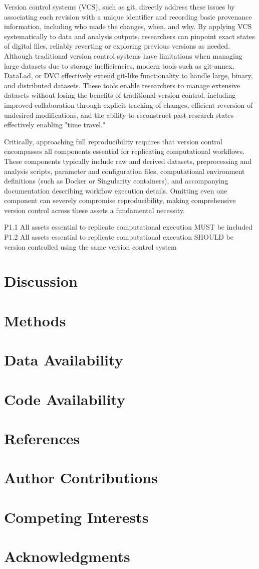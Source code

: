 \documentclass{article}
\begin{document}
Version control systems (VCS), such as git, directly address these issues by associating each revision with a unique identifier and recording basic provenance information, including who made the changes, when, and why.
By applying VCS systematically to data and analysis outputs, researchers can pinpoint exact states of digital files, reliably reverting or exploring previous versions as needed.
Although traditional version control systems have limitations when managing large datasets due to storage inefficiencies, modern tools such as git-annex, DataLad, or DVC effectively extend git-like functionality to handle large, binary, and distributed datasets.
These tools enable researchers to manage extensive datasets without losing the benefits of traditional version control, including improved collaboration through explicit tracking of changes, efficient reversion of undesired modifications, and the ability to reconstruct past research states—effectively enabling "time travel."

Critically, approaching full reproducibility requires that version control encompasses all components essential for replicating computational workflows.
These components typically include raw and derived datasets, preprocessing and analysis scripts, parameter and configuration files, computational environment definitions (such as Docker or Singularity containers), and accompanying documentation describing workflow execution details.
Omitting even one component can severely compromise reproducibility, making comprehensive version control across these assets a fundamental necessity.

P1.1 All assets essential to replicate computational execution MUST be included
P1.2 All assets essential to replicate computational execution SHOULD be version controlled using the same version control system

\section{Discussion}
\section{Methods}
\section{Data Availability}
\section{Code Availability}
\section{References}
\section{Author Contributions}
\section{Competing Interests}
\section{Acknowledgments}
\end{document}
